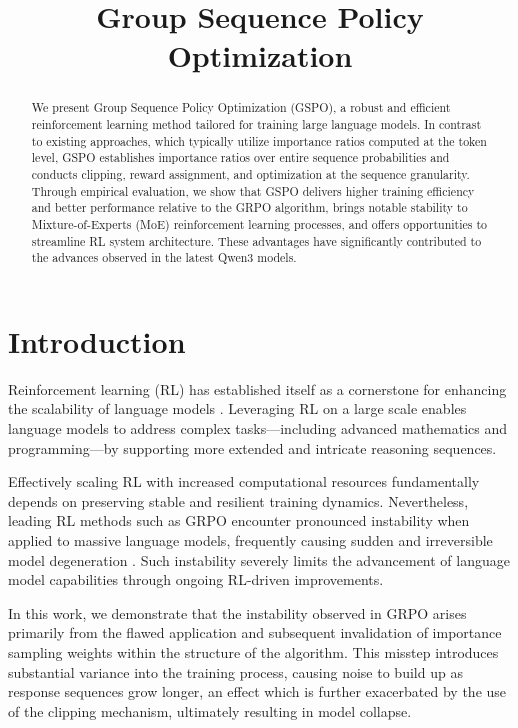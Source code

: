 \title{Group Sequence Policy Optimization}

\begin{abstract}
We present Group Sequence Policy Optimization (GSPO), a robust and efficient reinforcement learning method tailored for training large language models. In contrast to existing approaches, which typically utilize importance ratios computed at the token level, GSPO establishes importance ratios over entire sequence probabilities and conducts clipping, reward assignment, and optimization at the sequence granularity. Through empirical evaluation, we show that GSPO delivers higher training efficiency and better performance relative to the GRPO algorithm, brings notable stability to Mixture-of-Experts (MoE) reinforcement learning processes, and offers opportunities to streamline RL system architecture. These advantages have significantly contributed to the advances observed in the latest Qwen3 models.
\end{abstract}

\section{Introduction}
\label{sec:intro}

Reinforcement learning (RL) has established itself as a cornerstone for enhancing the scalability of language models \citep{o1,dpsk-r1,qwq32b,qwen3}. Leveraging RL on a large scale enables language models to address complex tasks—including advanced mathematics and programming—by supporting more extended and intricate reasoning sequences.

Effectively scaling RL with increased computational resources fundamentally depends on preserving stable and resilient training dynamics. Nevertheless, leading RL methods such as GRPO \citep{grpo} encounter pronounced instability when applied to massive language models, frequently causing sudden and irreversible model degeneration \citep{qwen3, minimax-m1}. Such instability severely limits the advancement of language model capabilities through ongoing RL-driven improvements.

In this work, we demonstrate that the instability observed in GRPO arises primarily from the flawed application and subsequent invalidation of importance sampling weights within the structure of the algorithm. This misstep introduces substantial variance into the training process, causing noise to build up as response sequences grow longer, an effect which is further exacerbated by the use of the clipping mechanism, ultimately resulting in model collapse.


